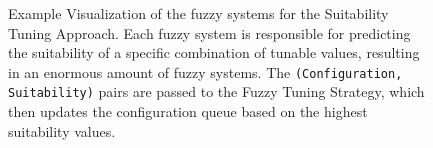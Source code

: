 \begin{figure}[H]

  \caption[Visualization of the fuzzy systems for the Suitability Tuning Approach]{Example Visualization of the fuzzy systems for the Suitability Tuning Approach. Each fuzzy system is responsible for predicting the suitability of a specific combination of tunable values, resulting in an enormous amount of fuzzy systems. The \texttt{(Configuration, Suitability)} pairs are passed to the Fuzzy Tuning Strategy, which then updates the configuration queue based on the highest suitability values.}
  \label{fig:fuzzySystemSuitability}
\end{figure}


